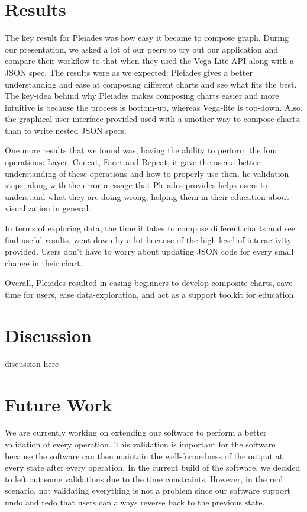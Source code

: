 \documentclass[journal]{vgtc}                %
\begin{document}
\section{Results}

The key result for Pleiades was how easy it became to compose graph. 
During our presentation, we asked a lot of our peers to try out our 
application and compare their workflow to that when they used the 
Vega-Lite API along with a JSON spec. The results were as we expected: Pleiades 
gives a better understanding and ease at composing different charts and see
what fits the best. The key-idea behind why Pleiades makes composing charts 
easier and more intuitive is because the process is bottom-up, 
whereas Vega-lite is top-down. Also, the graphical user interface 
provided used with a smother way to compose charts, than to write nested JSON specs. 

One more results that we found was, having the ability to perform 
the four operations: Layer, Concat, Facet and Repeat, it gave the user
a better understanding of these operations and how to properly use then. 
he validation steps, along with the error message that Pleiades provides 
helps users to understand what they are doing wrong, helping them in their 
education about visualization in general. 

In terms of exploring data, the time it takes to compose different 
charts and see find useful results, went down by a lot because of the 
high-level of interactivity provided. Users don’t have to worry about 
updating JSON code for every small change in their chart.

Overall, Pleiades resulted in easing beginners to develop composite 
charts, save time for users, ease data-exploration, and act as a 
support toolkit for education. 


\section{Discussion}

discussion here

\section{Future Work}
We are currently working on extending our software to perform a better validation
of every operation. This validation is important for the software because the
software can then maintain the well-formedness of the output at every state after
every operation. In the current build of the software, we decided to left out some
validations due to the time constraints. However, in the real scenario, not validating
everything is not a problem since our software support undo and redo that users
can always reverse back to the previous state.
\end{document}
